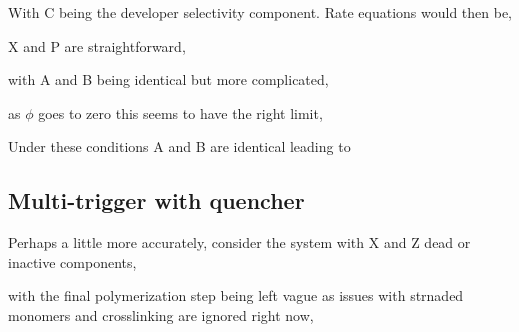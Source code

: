 



With C being the developer selectivity component.
Rate equations would then be,






X and P are straightforward,

with A and B being identical but more complicated,

as $\phi$ goes to zero this seems to have the right limit,


Under these conditions A and B are identical leading to


\subsection{Multi-trigger with quencher }

Perhaps a little more accurately, consider the system
with X and Z dead or inactive components, 






with the final polymerization step being left vague as issues
with strnaded monomers and crosslinking are ignored right now, 

